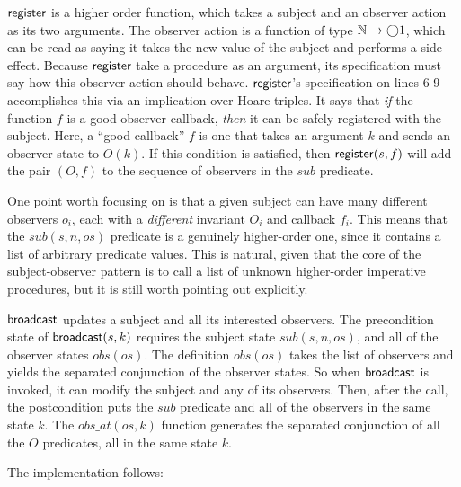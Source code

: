 $\mathsf{register}$ is a higher order function, which takes a subject
and an observer action as its two arguments. The observer action is a
function of type $\mathbb{N} \to \bigcirc{1}$, which can be read as saying it
takes the new value of the subject and performs a side-effect. Because
$\mathsf{register}$ take a procedure as an argument, its specification
must say how this observer action should behave. $\mathsf{register}$'s
specification on lines 6-9 accomplishes this via an implication over
Hoare triples. It says that \emph{if} the function $f$ is a good
observer callback, \emph{then} it can be safely registered with the
subject. Here, a ``good callback'' $f$ is one that takes an argument
$k$ and sends an observer state to $O(k)$. If this condition is
satisfied, then $\mathsf{register}(s, f)$ will add the pair $(O,f)$ to
the sequence of observers in the $sub$ predicate.

One point worth focusing on is that a given subject can have many
different observers $o_i$, each with a \emph{different} invariant
$O_i$ and callback $f_i$. This means that the $\mathit{sub}(s, n, os)$
predicate is a genuinely higher-order one, since it contains a list of
arbitrary predicate values. This is natural, given that the core of
the subject-observer pattern is to call a list of unknown higher-order
imperative procedures, but it is still worth pointing out explicitly. 

$\mathsf{broadcast}$ updates a subject and all its interested
observers.  The precondition state of $\mathsf{broadcast}(s,k)$
requires the subject state $sub(s,n,os)$, and all of the observer
states $obs(os)$. The definition $obs(os)$ takes the list of observers
and yields the separated conjunction of the observer states. So when
$\mathsf{broadcast}$ is invoked, it can modify the subject and any of
its observers. Then, after the call, the postcondition puts the $sub$
predicate and all of the observers in the same state $k$. The
$obs\_at(os,k)$ function generates the separated conjunction of all
the $O$ predicates, all in the same state $k$.

The implementation follows:

